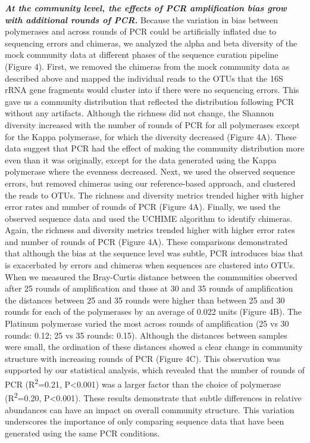 \documentclass[11pt,]{article}
\begin{document}
\textbf{\emph{At the community level, the effects of PCR amplification
bias grow with additional rounds of PCR.}} Because the variation in bias
between polymerases and across rounds of PCR could be artificially
inflated due to sequencing errors and chimeras, we analyzed the alpha
and beta diversity of the mock community data at different phases of the
sequence curation pipeline (Figure 4). First, we removed the chimeras
from the mock community data as described above and mapped the
individual reads to the OTUs that the 16S rRNA gene fragments would
cluster into if there were no sequencing errors. This gave us a
community distribution that reflected the distribution following PCR
without any artifacts. Although the richness did not change, the Shannon
diversity increased with the number of rounds of PCR for all polymerases
except for the Kappa polymerase, for which the diversity decreased
(Figure 4A). These data suggest that PCR had the effect of making the
community distribution more even than it was originally, except for the
data generated using the Kappa polymerase where the evenness decreased.
Next, we used the observed sequence errors, but removed chimeras using
our reference-based approach, and clustered the reads to OTUs. The
richness and diversity metrics trended higher with higher error rates
and number of rounds of PCR (Figure 4A). Finally, we used the observed
sequence data and used the UCHIME algorithm to identify chimeras. Again,
the richness and diversity metrics trended higher with higher error
rates and number of rounds of PCR (Figure 4A). These comparisons
demonstrated that although the bias at the sequence level was subtle,
PCR introduces bias that is exacerbated by errors and chimeras when
sequences are clustered into OTUs. When we measured the Bray-Curtis
distance between the communities observed after 25 rounds of
amplification and those at 30 and 35 rounds of amplification the
distances between 25 and 35 rounds were higher than between 25 and 30
rounds for each of the polymerases by an average of 0.022 units (Figure
4B). The Platinum polymerase varied the most across rounds of
amplification (25 vs 30 rounds: 0.12; 25 vs 35 rounds: 0.15). Although
the distances between samples were small, the ordination of these
distances showed a clear change in community structure with increasing
rounds of PCR (Figure 4C). This observation was supported by our
statistical analysis, which revealed that the number of rounds of PCR
(R\textsuperscript{2}=0.21, P\textless{}0.001) was a larger factor than
the choice of polymerase (R\textsuperscript{2}=0.20, P\textless{}0.001).
These results demonstrate that subtle differences in relative abundances
can have an impact on overall community structure. This variation
underscores the importance of only comparing sequence data that have
been generated using the same PCR conditions.
\end{document}

